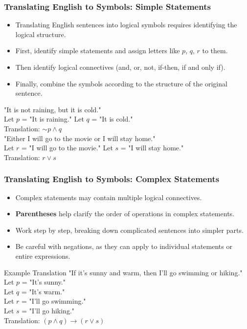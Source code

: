 \documentclass{beamer}
\begin{document}
            \begin{frame}
            \frametitle{Translating English to Symbols: Simple Statements}
            \begin{itemize}
                \item Translating English sentences into logical symbols requires identifying the logical structure.
                \item First, identify simple statements and assign letters like $p$, $q$, $r$ to them.
                \item Then identify logical connectives (and, or, not, if-then, if and only if).
                \item Finally, combine the symbols according to the structure of the original sentence.
            \end{itemize}
            
            \begin{example}
            "It is not raining, but it is cold."\\
            Let $p$ = "It is raining." Let $q$ = "It is cold."\\
            Translation: $\sim p \wedge q$\\[0.3cm]
            "Either I will go to the movie or I will stay home."\\
            Let $r$ = "I will go to the movie." Let $s$ = "I will stay home."\\
            Translation: $r \vee s$
            \end{example}
            \end{frame}
            
            \begin{frame}
            \frametitle{Translating English to Symbols: Complex Statements}
            \begin{itemize}
                \item Complex statements may contain multiple logical connectives.
                \item \textbf{Parentheses} help clarify the order of operations in complex statements.
                \item Work step by step, breaking down complicated sentences into simpler parts.
                \item Be careful with negations, as they can apply to individual statements or entire expressions.
            \end{itemize}
            
            \begin{block}{Example Translation}
            "If it's sunny and warm, then I'll go swimming or hiking."\\[0.2cm]
            Let $p$ = "It's sunny."\\
            Let $q$ = "It's warm."\\
            Let $r$ = "I'll go swimming."\\
            Let $s$ = "I'll go hiking."\\[0.2cm]
            Translation: $(p \wedge q) \rightarrow (r \vee s)$
            \end{block}
            \end{frame}
            
\end{document}
